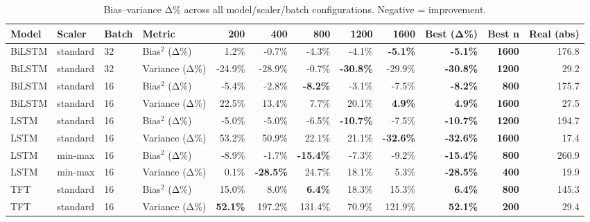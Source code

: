 \renewcommand{\arraystretch}{1.2}
\begin{table}[!t]
\centering
\footnotesize
\caption{Bias–variance Δ\% across all model/scaler/batch configurations. Negative = improvement.}
\label{tab:bvdelta_all}
\setlength{\tabcolsep}{4pt}
\begin{tabular}{l l l l rrrrrrrr}
\toprule
Model & Scaler & Batch & Metric & 200 & 400 & 800 & 1200 & 1600 & Best (Δ\%) & Best n & Real (abs) \\
\midrule
BiLSTM & standard & 32 & Bias$^2$ (Δ\%) & 1.2\% & -0.7\% & -4.3\% & -4.1\% & \textbf{-5.1\%} & \textbf{-5.1\%} & \textbf{1600} & 176.8 \\
BiLSTM & standard & 32 & Variance (Δ\%) & -24.9\% & -28.9\% & -0.7\% & \textbf{-30.8\%} & -29.9\% & \textbf{-30.8\%} & \textbf{1200} & 29.2 \\
BiLSTM & standard & 16 & Bias$^2$ (Δ\%) & -5.4\% & -2.8\% & \textbf{-8.2\%} & -3.1\% & -7.5\% & \textbf{-8.2\%} & \textbf{800} & 175.7 \\
BiLSTM & standard & 16 & Variance (Δ\%) & 22.5\% & 13.4\% & 7.7\% & 20.1\% & \textbf{4.9\%} & \textbf{4.9\%} & \textbf{1600} & 27.5 \\
LSTM & standard & 16 & Bias$^2$ (Δ\%) & -5.0\% & -5.0\% & -6.5\% & \textbf{-10.7\%} & -7.5\% & \textbf{-10.7\%} & \textbf{1200} & 194.7 \\
LSTM & standard & 16 & Variance (Δ\%) & 53.2\% & 50.9\% & 22.1\% & 21.1\% & \textbf{-32.6\%} & \textbf{-32.6\%} & \textbf{1600} & 17.4 \\
LSTM & min-max & 16 & Bias$^2$ (Δ\%) & -8.9\% & -1.7\% & \textbf{-15.4\%} & -7.3\% & -9.2\% & \textbf{-15.4\%} & \textbf{800} & 260.9 \\
LSTM & min-max & 16 & Variance (Δ\%) & 0.1\% & \textbf{-28.5\%} & 24.7\% & 18.1\% & 5.3\% & \textbf{-28.5\%} & \textbf{400} & 19.9 \\
TFT & standard & 16 & Bias$^2$ (Δ\%) & 15.0\% & 8.0\% & \textbf{6.4\%} & 18.3\% & 15.3\% & \textbf{6.4\%} & \textbf{800} & 145.3 \\
TFT & standard & 16 & Variance (Δ\%) & \textbf{52.1\%} & 197.2\% & 131.4\% & 70.9\% & 121.9\% & \textbf{52.1\%} & \textbf{200} & 29.4 \\
\bottomrule
\end{tabular}

\end{table}

